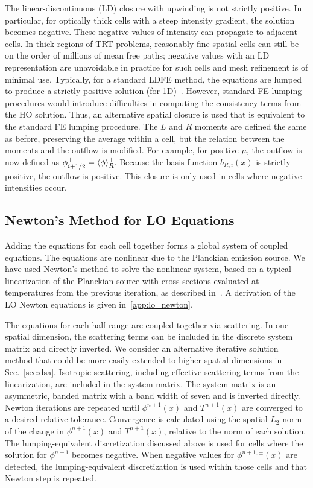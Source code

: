 The linear-discontinuous (LD) closure with upwinding is not strictly positive.  In particular, for
optically thick cells with a steep intensity gradient, the solution becomes negative.
These negative values of intensity can propagate to adjacent cells. In thick regions of
TRT problems, reasonably fine spatial cells can still be on the order of millions of mean
free paths; negative values with an LD representation are unavoidable in practice for
such cells and mesh refinement is of minimal use.  Typically, for a standard LDFE method,
the equations are lumped to produce a strictly positive solution (for 1D)~\cite{morel_ldtrt}. However, standard FE lumping
procedures would introduce difficulties in computing the consistency terms from the
HO solution.  Thus, an alternative spatial closure is used that is equivalent to the
standard FE lumping procedure.  The $L$ and $R$ moments are defined the same as before,
preserving the average within a cell, but the relation between the moments and
the outflow is modified.   For example, for positive $\mu$,
the outflow is now defined as $\phi^+_{i+1/2} = \langle \phi \rangle_R^+.$  Because the basis function $b_{R,i}(x)$ is strictly
positive, the outflow is positive.  This closure is only used
in cells where negative intensities occur.

\subsection{Newton's Method for LO Equations}

Adding the equations for each cell together forms a global system of coupled equations.
The equations are nonlinear due to the Planckian emission source.  
We have used Newton's method to solve the nonlinear system, based on a typical linearization of the Planckian source with cross
sections evaluated at temperatures from the previous iteration, as described
in~\cite{morel_ldtrt}.  A derivation of the LO Newton equations is given
in~\ref{app:lo_newton}.

The equations for each half-range are coupled together via scattering.  
In one spatial dimension, the scattering terms can be included in the discrete system
matrix and directly inverted.  We consider an alternative iterative solution method that
could be more easily extended to higher spatial dimensions in Sec.~\ref{sec:dsa}.
Isotropic scattering,
including effective scattering terms from the linearization, are included in the system matrix. The system
matrix is an asymmetric, banded matrix with a band width of seven and is inverted
directly. 
Newton iterations are repeated until $\phi^{n+1}(x)$ and $T^{n+1}(x)$ are converged
to a desired relative tolerance.  Convergence is calculated using the spatial $L_2$
norm of the change in $\phi^{n+1}(x)$ and $T^{n+1}(x)$, relative to the norm of each
solution.  The lumping-equivalent discretization
discussed above is used for cells where the solution for
$\phi^{n+1}$ becomes negative. When negative values for $\phi^{n+1,\pm}(x)$ are detected, the lumping-equivalent discretization is used within
those cells and that Newton step is repeated. 


